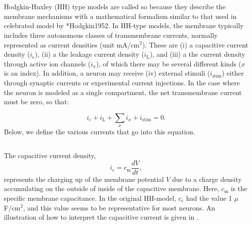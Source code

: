 \section{}
\label{sec:Neuron:membranecurrents}
Hodgkin-Huxley (HH) type models are called so because they describe the membrane mechanisms with a mathematical formalism similar to that used in celebrated model by \citeasnoun**{Hodgkin1952}. In HH-type models, the membrane typically includes three autonomous classes of transmembrane currents, normally represented as current densities (unit mA/cm$^2$). These are (i) a capacitive current density ($i_{\mathrm{c}}$), (ii) a the leakage current density ($i_{\mathrm{L}}$), and (iii) a the current density through active ion channels ($i_x$), of which there may be several different kinds ($x$ is an index). 
In addition, a neuron may receive  (iv) external stimuli ($i_{\mathrm{stim}}$) either through synaptic currents or experimental current injections. In the case where the neuron is modeled as a single compartment, the net transmembrane current must be zero, so that:

\begin{equation}
i_{\mathrm{c}} + i_{\mathrm{L}} + \sum_x{i_x} +  i_{\mathrm{stim}} = 0.
\label{eq:Neuron:singlecomp_zerosum}
\end{equation}
Below, we define the various currents that go into this equation.


\subsection{}
\label{sec:Neuron:Cap}

The capacitive current density,
\begin{equation}
i_{\mathrm{c}} = c_{\mathrm{m}} \frac{dV}{dt},
\label{eq:Neuron:HHcap}
\end{equation}
represents the charging up of the membrane potential $V$ due to a charge density accumulating on the outside of inside of the capacitive membrane. Here, $c_{\mathrm{m}}$ is the specific membrane capacitance. In the original HH-model, $c_{\mathrm{c}}$ had the value 1 $\mu$F/cm$^2$, and this value seems to be representative for most neurons.  An illustration of how to interpret the capacitive current is given in . 

